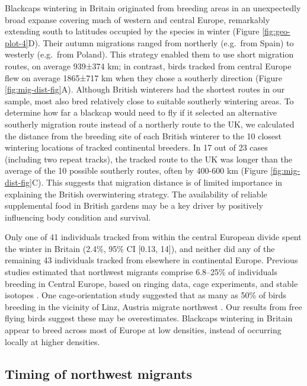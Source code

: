 \documentclass[a4paper, twoside]{templates/ociamthesis}
\begin{document}
Blackcaps wintering in Britain originated from breeding areas in an unexpectedly broad expanse covering much of western and central Europe, remarkably extending south to latitudes occupied by the species in winter (Figure \ref{fig:geo-plot-4}D). Their autumn migrations ranged from northerly (e.g.~from Spain) to westerly (e.g.~from Poland).
This strategy enabled them to use short migration routes, on average 939±374 km; in contrast, birds tracked from central Europe flew on average 1865±717 km when they chose a southerly direction (Figure \ref{fig:mig-dist-fig}A).
Although British winterers had the shortest routes in our sample, most also bred relatively close to suitable southerly wintering areas.
To determine how far a blackcap would need to fly if it selected an alternative southerly migration route instead of a northerly route to the UK, we calculated the distance from the breeding site of each British winterer to the 10 closest wintering locations of tracked continental breeders.
In 17 out of 23 cases (including two repeat tracks), the tracked route to the UK was longer than the average of the 10 possible southerly routes, often by 400-600 km (Figure \ref{fig:mig-dist-fig}C).
This suggests that migration distance is of limited importance in explaining the British overwintering strategy. The availability of reliable supplemental food in British gardens may be a key driver \autocite{plummerSupplementaryFeedingGardens2015} by positively influencing body condition and survival.

Only one of 41 individuals tracked from within the central European divide spent the winter in Britain (2.4\%, 95\% CI {[}0.13, 14{]}), and neither did any of the remaining 43 individuals tracked from elsewhere in continental Europe.
Previous studies estimated that northwest migrants comprise 6.8--25\% of individuals breeding in Central Europe, based on ringing data, cage experiments, and stable isotopes \autocite{helbigPopulationDifferentiationMigratory1992,helbigSESWmigratingBlackcap1991,rolshausenSpringArrivalMigratory2010}.
One cage-orientation study suggested that as many as 50\% of birds breeding in the vicinity of Linz, Austria migrate northwest \autocite{helbigSESWmigratingBlackcap1991}.
Our results from free flying birds suggest these may be overestimates. Blackcaps wintering in Britain appear to breed across most of Europe at low densities, instead of occurring locally at higher densities.

\hypertarget{timing-of-northwest-migrants}{%
\subsection{Timing of northwest migrants}\label{timing-of-northwest-migrants}}
\end{document}
